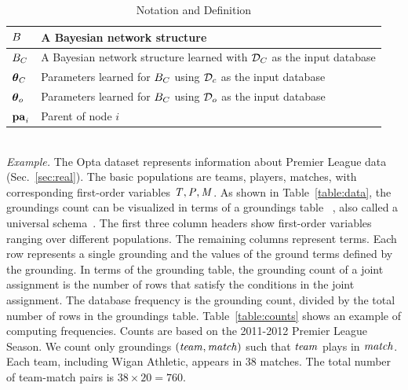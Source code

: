 {{\begin{table}
{\begin{tabular}{|l|l|}
 	 	      			$B$&A Bayesian network structure\\\hline
 	 	      			$B_{C}$ & A Bayesian network structure learned with $\mathcal{D}_{C}$ as the input database\\\hline
 	 	      			$\boldsymbol{\theta}_{C}$ & Parameters learned for $B_{C}$ using $\mathcal{D}_{c}$  as the input database\\\hline
 	 	      			$\boldsymbol{\theta}_{o}$ & Parameters learned for $B_{C}$ using $\mathcal{D}_{o}$  as the input database\\\hline
 	 	      			$\mathbf{pa}_{i}$&Parent of node $i$\\\hline
 	 	      		\end{tabular}} 	\caption[Table of Notations]{Notation and Definition	\label{table:notation}}
 	 	      	\end{table}\\
\emph{Example.} \label{sec:example}
%
The Opta dataset represents information about Premier League data %
(Sec.~\ref{sec:real}). 
The basic populations are teams, players, matches, with 
corresponding first-order variables $\it{T}, \it{P}, \it{M}$. As shown in Table~\ref{table:data}, the groundings count can be visualized in terms of a groundings table ~\cite{Schulte2012}, also called a universal schema~\cite{Riedel2013}. 
The first three column headers show first-order variables ranging over different populations. The remaining columns represent terms. Each row represents a single grounding and the values of the ground terms defined by the grounding.
In terms of the grounding table, the grounding count of a joint assignment is the number of rows that satisfy the conditions in the joint assignment. The database frequency is the grounding count, divided by the total number of rows in the groundings table. Table~\ref{table:counts} shows an example of computing frequencies. Counts are based on the 2011-2012 Premier League Season. We count only groundings $(\it{team},\it{match})$ such that $\it{team}$ plays in $\it{match}$. Each team, including Wigan Athletic, appears in 38 matches. The total number of team-match pairs is $38 \times 20 = 760$.

}}
